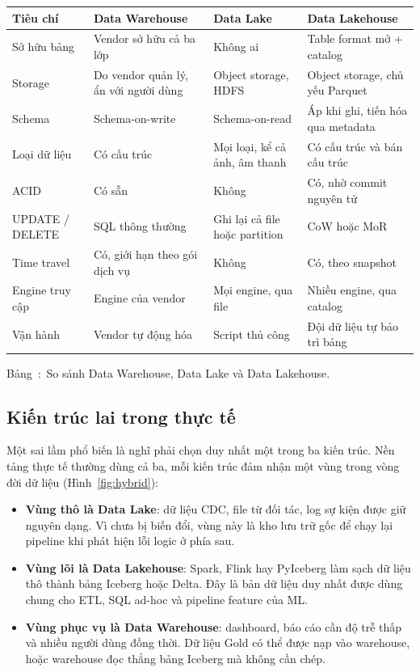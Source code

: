 \documentclass[12pt]{article}
\newenvironment{figblock}{\par\medskip\noindent\begin{minipage}{\linewidth}}{\end{minipage}\par\medskip}
\newcounter{bang}
\newcommand{\tabcap}[2]{%
  \begin{captionbelowboxaivn}\refstepcounter{bang}Bảng~\thebang:~#1\label{#2}\end{captionbelowboxaivn}}
\begin{document}
\begin{figblock}\begin{center}
\renewcommand{\arraystretch}{1.3}
\begin{tabularx}{\linewidth}{|P{2.6cm}|L|L|L|}
\hline
{}
\textbf{Tiêu chí} & \textbf{Data Warehouse} & \textbf{Data Lake} & \textbf{Data Lakehouse} \\
\hline
Sở hữu bảng & Vendor sở hữu cả ba lớp & Không ai & Table format mở + catalog \\
\hline
Storage & Do vendor quản lý, ẩn với người dùng & Object storage, HDFS & Object storage, chủ yếu Parquet \\
\hline
Schema & Schema-on-write & Schema-on-read & Áp khi ghi, tiến hóa qua metadata \\
\hline
Loại dữ liệu & Có cấu trúc & Mọi loại, kể cả ảnh, âm thanh & Có cấu trúc và bán cấu trúc \\
\hline
ACID & Có sẵn & Không & Có, nhờ commit nguyên tử \\
\hline
UPDATE / DELETE & SQL thông thường & Ghi lại cả file hoặc partition & CoW hoặc MoR \\
\hline
Time travel & Có, giới hạn theo gói dịch vụ & Không & Có, theo snapshot \\
\hline
Engine truy cập & Engine của vendor & Mọi engine, qua file & Nhiều engine, qua catalog \\
\hline
Vận hành & Vendor tự động hóa & Script thủ công & Đội dữ liệu tự bảo trì bảng \\
\hline
\end{tabularx}
\end{center}
\tabcap{So sánh Data Warehouse, Data Lake và Data Lakehouse.}{tab:compare}
\end{figblock}

\subsection{Kiến trúc lai trong thực tế}

Một sai lầm phổ biến là nghĩ phải chọn duy nhất một trong ba kiến trúc. Nền tảng thực tế thường dùng cả ba, mỗi kiến trúc đảm nhận một vùng trong vòng đời dữ liệu (Hình~\ref{fig:hybrid}):

\begin{itemize}
    \item \textbf{Vùng thô là Data Lake}: dữ liệu CDC, file từ đối tác, log sự kiện được giữ nguyên dạng. Vì chưa bị biến đổi, vùng này là kho lưu trữ gốc để chạy lại pipeline khi phát hiện lỗi logic ở phía sau.
    \item \textbf{Vùng lõi là Data Lakehouse}: Spark, Flink hay PyIceberg làm sạch dữ liệu thô thành bảng Iceberg hoặc Delta. Đây là bản dữ liệu duy nhất được dùng chung cho ETL, SQL ad-hoc và pipeline feature của ML.
    \item \textbf{Vùng phục vụ là Data Warehouse}: dashboard, báo cáo cần độ trễ thấp và nhiều người dùng đồng thời. Dữ liệu Gold có thể được nạp vào warehouse, hoặc warehouse đọc thẳng bảng Iceberg mà không cần chép.
\end{itemize}
\end{document}
